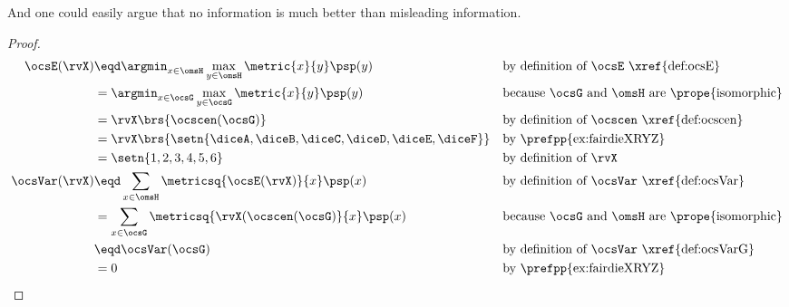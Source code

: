 \begin{tabstr}{0.75}
\begin{example}
And one could easily argue that no information is much better than misleading information.
\end{example}
\begin{proof}
    \begin{align*}
      \ocsE(\rvX)
        &\eqd \argmin_{x\in\omsH}\max_{y\in\omsH}\metric{x}{y}\psp(y)
        &&\text{by definition of $\ocsE$ \xref{def:ocsE}}
      \\&= \argmin_{x\in\ocsG}\max_{y\in\ocsG}\metric{x}{y}\psp(y)
        &&\text{because $\ocsG$ and $\omsH$ are \prope{isomorphic}}
      \\&= \rvX\brs{\ocscen(\ocsG)}
        &&\text{by definition of $\ocscen$ \xref{def:ocscen}}
      \\&= \rvX\brs{\setn{\diceA,\diceB,\diceC,\diceD,\diceE,\diceF}}
        &&\text{by \prefpp{ex:fairdieXRYZ}}
      \\&= \setn{1,2,3,4,5,6}
        &&\text{by definition of $\rvX$}
      \\
      \ocsVar(\rvX)
        &\eqd \sum_{x\in\omsH}\metricsq{\ocsE(\rvX)}{x}\psp(x)
        &&\text{by definition of $\ocsVar$ \xref{def:ocsVar}}
      \\&=\sum_{x\in\ocsG}\metricsq{\rvX(\ocscen(\ocsG)}{x}\psp(x)
        &&\text{because $\ocsG$ and $\omsH$ are \prope{isomorphic}}
      \\&\eqd\ocsVar(\ocsG)
        && \text{by definition of $\ocsVar$ \xref{def:ocsVarG}}
      \\&= 0
        &&\text{by \prefpp{ex:fairdieXRYZ}}

\end{align*}
\end{proof}
\end{tabstr}
